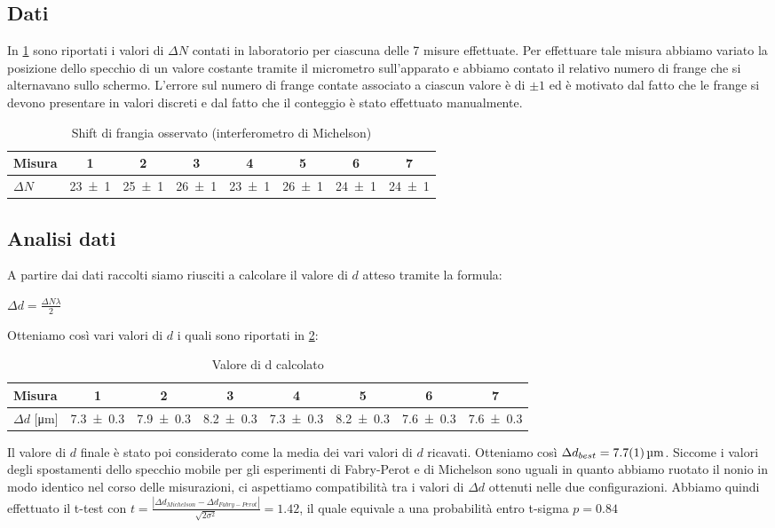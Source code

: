 \documentclass[a4paper]{article}
\begin{document}
\subsection{Dati}
In \cref{tab:micrometro-michelson} sono riportati i valori di $\Delta N$ contati in laboratorio per ciascuna delle 7 misure effettuate. Per effettuare tale misura abbiamo variato la posizione dello specchio di un valore costante tramite il micrometro sull'apparato e abbiamo contato il relativo numero di frange che si alternavano sullo schermo. L'errore sul numero di frange contate associato a ciascun valore è di $\pm1$ ed è motivato dal fatto che le frange si devono presentare in valori discreti e dal fatto che il conteggio è stato effettuato manualmente. 
\begin{table}[htbp]
\centering
\caption{Shift di frangia osservato (interferometro di Michelson)}
\begin{tabular}{|l|ccccccc|}
\hline
Misura & 1 & 2 & 3 & 4 & 5 & 6 & 7 \\\hline\hline
$\Delta N$ & \num{23 \pm 1} & \num{25 \pm 1} & \num{26 \pm 1} & \num{23 \pm 1} & \num{26 \pm 1} & \num{24 \pm 1} & \num{24 \pm 1} \\\hline
\end{tabular}
\label{tab:micrometro-michelson}
\end{table}
\subsection{Analisi dati}
A partire dai dati raccolti siamo riusciti a calcolare il valore di $d$ atteso tramite la formula: 
\begin{center}
    $\Delta d=\frac{\Delta N \lambda}{2}$
\end{center}
Otteniamo così vari valori di $d$ i quali sono riportati in \cref{tab:valori-d-michelson}:
\begin{table}[htbp]
\centering
\caption{Valore di d calcolato}
\begin{tabular}{|l|ccccccc|}
\hline
Misura & 1 & 2 & 3 & 4 & 5 & 6 & 7 \\\hline\hline
$\Delta d$ [\si{\micro\meter}] & \num{7.3 \pm 0.3} & \num{7.9 \pm 0.3} & \num{8.2 \pm 0.3} & \num{7.3 \pm 0.3} & \num{8.2 \pm 0.3} & \num{7.6 \pm 0.3} & \num{7.6 \pm 0.3} \\\hline
\end{tabular}
\label{tab:valori-d-michelson}
\end{table} 
Il valore di $d$ finale è stato poi considerato come la media dei vari valori di $d$ ricavati. Otteniamo così $\Delta d_{best}=\SI{7.7 \pm 0.1}{\micro\meter}$.
Siccome i valori degli spostamenti dello specchio mobile per gli esperimenti di Fabry-Perot e di Michelson sono uguali in quanto abbiamo ruotato il nonio in modo identico nel corso delle misurazioni, ci aspettiamo compatibilità tra i valori di $\Delta d$ ottenuti nelle due configurazioni. Abbiamo quindi effettuato il t-test con $t=\frac{|\Delta d_{Michelson}-\Delta d_{Fabry-Perot}|}{\sqrt{2\sigma^2}}=\num{1.42}$, il quale equivale a una probabilità entro t-sigma $p=\num{0.84}$
\end{document}
